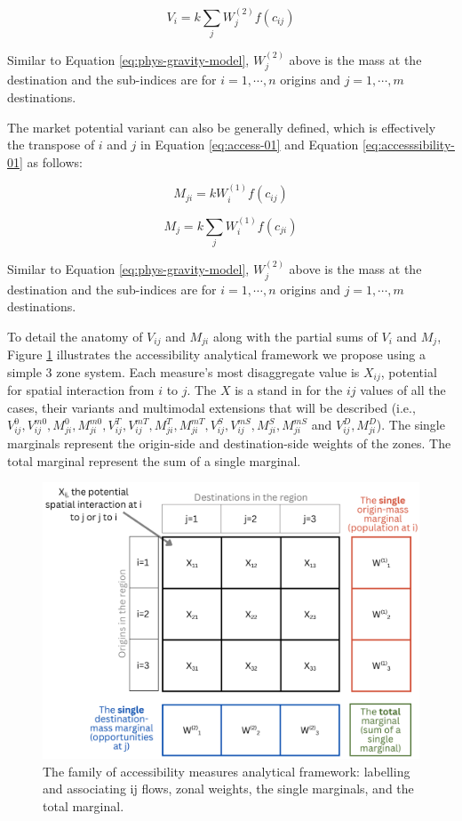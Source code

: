 \documentclass[
11pt, %
oneside, %
english, %
singlespacing, %
]{macthesis} %
\begin{document}
\begin{equation}
\label{eq:accesssibility-01}
V_{i} = k \sum_j W_j^{(2)} f(c_{ij})
\end{equation} 

Similar to Equation \ref{eq:phys-gravity-model}, \(W_j^{(2)}\) above is the mass at the destination and the sub-indices are for \(i = 1,\cdots, n\) origins and \(j = 1,\cdots, m\) destinations.

The market potential variant can also be generally defined, which is effectively the transpose of \(i\) and \(j\) in Equation \ref{eq:access-01} and Equation \ref{eq:accesssibility-01} as follows:

\begin{equation}
\label{eq:market-01}
M_{ji} = k W_i^{(1)} f(c_{ij})
\end{equation} 

\begin{equation}
\label{eq:market-potential-01}
M_{j} = k \sum_j W_i^{(1)} f(c_{ji})
\end{equation} 

Similar to Equation \ref{eq:phys-gravity-model}, \(W_j^{(2)}\) above is the mass at the destination and the sub-indices are for \(i = 1,\cdots, n\) origins and \(j = 1,\cdots, m\) destinations.

To detail the anatomy of \(V_{ij}\) and \(M_{ji}\) along with the partial sums of \(V_i\) and \(M_j\), Figure \ref{fig:chp2-fig-analytical-device-conc-accessibility} illustrates the accessibility analytical framework we propose using a simple 3 zone system. Each measure's most disaggregate value is \(X_{ij}\), potential for spatial interaction from \(i\) to \(j\). The \(X\) is a stand in for the \(ij\) values of all the cases, their variants and multimodal extensions that will be described (i.e., \(V_{ij}^0, V_{ij}^{m0}, M_{ji}^0, M_{ji}^{m0}, V_{ij}^T, V_{ij}^{mT}, M_{ji}^T, M_{ji}^{mT}, V_{ij}^S, V_{ij}^{mS}, M_{ji}^S, M_{ji}^{mS}\) and \(V_{ij}^D, M_{ji}^D\)). The single marginals represent the origin-side and destination-side weights of the zones. The total marginal represent the sum of a single marginal.

\begin{figure}
\includegraphics[width=0.7\linewidth]{data/figures/chp2-access-analytical-device} \caption{The family of accessibility measures analytical framework: labelling and associating ij flows, zonal weights, the single marginals, and the total marginal.}\label{fig:chp2-fig-analytical-device-conc-accessibility}
\end{figure}
\end{document}
